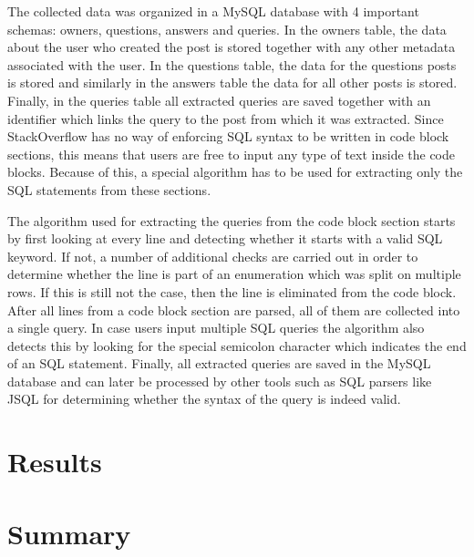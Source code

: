 The collected data was organized in a MySQL database with 4 important schemas: owners, questions, answers and queries. In the owners table, the data about the user who created the post is stored together with any other metadata associated with the user. In the questions table, the data for the questions posts is stored and similarly in the answers table the data for all other posts is stored. Finally, in the queries table all extracted queries are saved together with an identifier which links the query to the post from which it was extracted. Since StackOverflow has no way of enforcing SQL syntax to be written in code block sections, this means that users are free to input any type of text inside the code blocks. Because of this, a special algorithm has to be used for extracting only the SQL statements from these sections.

The algorithm used for extracting the queries from the code block section starts by first looking at every line and detecting whether it starts with a valid SQL keyword. If not, a number of additional checks are carried out in order to determine whether the line is part of an enumeration which was split on multiple rows. If this is still not the case, then the line is eliminated from the code block. After all lines from a code block section are parsed, all of them are collected into a single query. In case users input multiple SQL queries the algorithm also detects this by looking for the special semicolon character which indicates the end of an SQL statement. Finally, all extracted queries are saved in the MySQL database and can later be processed by other tools such as SQL parsers like JSQL for determining whether the syntax of the query is indeed valid.


\section{Results}

\section{Summary}
